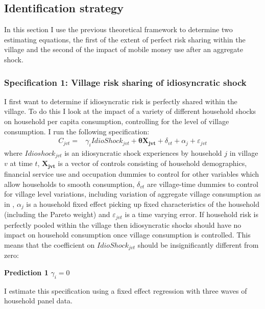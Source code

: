 \clearpage
\subsection{Identification strategy} 
In this section I use the previous theoretical framework to determine two estimating equations, the first of the extent of perfect risk sharing within the village and the second of the impact of mobile money use after an aggregate shock. 

\subsubsection{Specification 1: Village risk sharing of idiosyncratic shock}
I first want to determine if idiosyncratic risk is perfectly shared within the village. To do this I look at the impact of a variety of different household shocks on household per capita consumption, controlling for the level of village consumption. I run the following specification: 
\begin{align} \label{eq: idioshock}
C_{jvt} = &   \gamma_i IdioShock_{jvt}  + \bm{\theta X_{jvt}}   +  \delta_{vt} + \alpha_j + \varepsilon_{jvt} 
\end{align}
where $Idioshock_{jvt}$ is an idiosyncratic shock experiences by household $j$ in village $v$ at time $t$,  $\bm{X_{jvt}}$ is a vector of controls consisting of household demographics, financial service use and occupation dummies to control for other variables which allow households to smooth consumption, $\delta_{vt}$ are village-time dummies to control for village level variations, including variation of aggregate village consumption as in \cite{ravallion1997risk}, $\alpha_j$ is a household fixed effect picking up fixed characteristics of the household (including the Pareto weight) and $\varepsilon_{jvt}$ is a time varying error. If household risk is perfectly pooled within the village then idiosyncratic shocks should have no impact on household consumption once village consumption is controlled. This means that the coefficient on $IdioShock_{jvt}$ should be insignificantly different from zero: 
\begin{description}
\item{\bf{Prediction 1}} $\gamma_i=0$
\end{description}

I estimate this specification using a fixed effect regression with three waves of household panel data.

